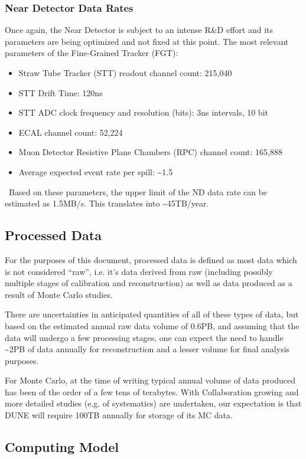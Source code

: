 \subsubsection{Near Detector Data Rates}
Once again, the Near Detector is subject to an intense R\&D effort and its
parameters are being optimized and not fixed at this point. The most relevant parameters
of the Fine-Grained Tracker (FGT):
\begin{itemize}
\item   Straw Tube Tracker (STT) readout channel count: 215,040
\item STT Drift Time: 120ns
\item STT ADC clock frequency and resolution (bits): 3ns intervals, 10 bit
\item ECAL channel count: 52,224
\item Muon Detector Resistive Plane Chambers (RPC) channel count: 165,888
\item Average expected event rate per spill: \textasciitilde 1.5
\end{itemize}
\
Based on these parameters, the upper limit of the ND data rate can be estimated as 1.5MB/s. This translates into \textasciitilde 45TB/year. 

\subsection{Processed Data}
\label{sec:detectors-sc-infrastructure-processed-data}
For the purposes of this document, processed data is defined as most data which is not considered ``raw'', i.e. it's data derived from raw (including possibly multiple stages
of calibration and reconstruction) as well as data produced as a result of Monte Carlo studies.

There are uncertainties in anticipated quantities of all of these types of data, but based on the estimated annual raw data volume of 0.6PB, and assuming that
the data will undergo a few processing stages, one can expect the need to handle \textasciitilde 2PB of data annually for reconstruction and a lesser
volume for final analysis purposes.

For Monte Carlo, at the time of writing typical annual volume of data produced has been of the order of a few tens of terabytes. With Collaboration growing
and more detailed studies (e.g. of systematics) are undertaken, our expectation is that DUNE will require 100TB annually for storage of its MC data.

\subsection{Computing Model}
\label{sec:detectors-sc-infrastructure-computing-model}

